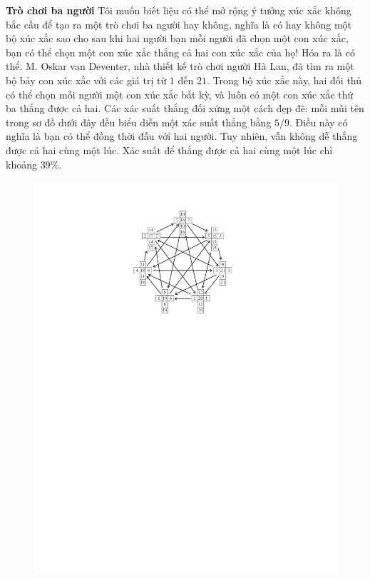 \begin{multicols}{2}
	\vskip 0.05cm
	\textbf{\color{quantoan}Trò chơi ba người}
	\vskip 0.05cm
	Tôi muốn biết liệu có thể mở rộng ý tưởng xúc xắc không bắc cầu để tạo ra một trò chơi ba người hay không, nghĩa là có hay không một bộ xúc xắc sao cho sau khi hai người bạn mỗi người đã chọn một con xúc xắc, bạn có thể chọn một con xúc xắc thắng cả hai con xúc xắc của họ!
	\vskip 0.05cm
	Hóa ra là có thể. M. Oskar van Deventer, nhà thiết kế trò chơi người Hà Lan, đã tìm ra một bộ bảy con xúc xắc với các giá trị từ $1$ đến $21$. Trong bộ xúc xắc này, hai đối thủ có thể chọn mỗi người một con xúc xắc bất kỳ, và luôn có một con xúc xắc thứ ba thắng được cả hai. Các xác suất thắng đối xứng một cách đẹp đẽ: mỗi mũi tên trong sơ đồ dưới đây đều biểu diễn một xác suất thắng bằng $5/9$.
	\vskip 0.05cm
	Điều này có nghĩa là bạn có thể đồng thời đấu với hai người. Tuy nhiên, vẫn không dễ thắng được cả hai cùng một lúc. Xác suất để thắng được cả hai cùng một lúc chỉ khoảng $39\%$.
	\begin{figure}[H]
		\vspace*{-10pt}
		\centering
		\captionsetup{labelformat= empty, justification=centering}
		\includegraphics[scale =0.6]{8}

\end{figure}
\end{multicols}
